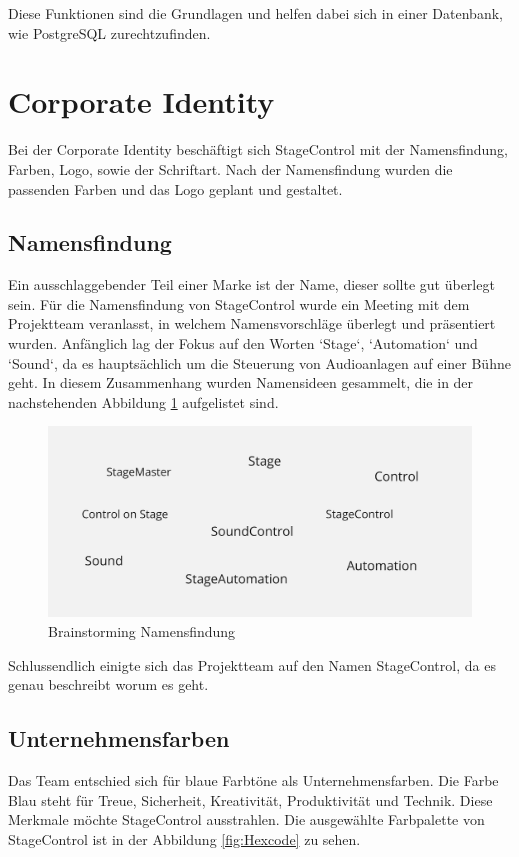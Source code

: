 Diese Funktionen sind die Grundlagen und helfen dabei sich in einer Datenbank, wie PostgreSQL zurechtzufinden.

\section{Corporate Identity}
Bei der Corporate Identity beschäftigt sich StageControl mit der Namensfindung, Farben, Logo, sowie der Schriftart. Nach der Namensfindung wurden die passenden Farben und das Logo geplant und gestaltet.

\subsection{Namensfindung}
Ein ausschlaggebender Teil einer Marke ist der Name, dieser sollte gut überlegt sein. Für die Namensfindung von StageControl wurde ein Meeting mit dem Projektteam veranlasst, in welchem Namensvorschläge überlegt und präsentiert wurden. 
Anfänglich lag der Fokus auf den Worten ‘Stage‘, ‘Automation‘ und ‘Sound‘, da es hauptsächlich um die Steuerung von Audioanlagen auf einer Bühne geht. In diesem Zusammenhang wurden Namensideen gesammelt, die in der nachstehenden Abbildung \ref{fig:Brainstorming_Namensfindung} aufgelistet sind. 

\begin{figure}[H]
	\centering
	\includegraphics[width=0.5\linewidth]{images/Brainstorming_Namensfindung.png}
	\caption[Brainstorming Namensfindung]{Brainstorming Namensfindung}
	\label{fig:Brainstorming_Namensfindung}
\end{figure}

Schlussendlich einigte sich das Projektteam auf den Namen StageControl, da es genau beschreibt worum es geht.

\newpage
\subsection{Unternehmensfarben}
Das Team entschied sich für blaue Farbtöne als Unternehmensfarben. Die Farbe Blau steht für Treue, Sicherheit, Kreativität, Produktivität und Technik. \parencite{BedeutungderFarbeBlau} Diese Merkmale möchte StageControl ausstrahlen. Die ausgewählte Farbpalette von StageControl ist in der Abbildung \ref{fig:Hexcode} zu sehen. 

